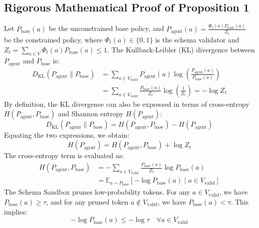\documentclass[10pt,journal,compsoc]{IEEEtran}
\begin{document}
\subsection{Rigorous Mathematical Proof of Proposition 1}
Let $P_{\text{base}}(a)$ be the unconstrained base policy, and $P_{\text{agent}}(a) = \frac{\Phi_t(a) P_{\text{base}}(a)}{Z_t}$ be the constrained policy, where $\Phi_t(a) \in \{0, 1\}$ is the schema validator and $Z_t = \sum_{a \in V} \Phi_t(a) P_{\text{base}}(a) \le 1$.
The Kullback-Leibler (KL) divergence between $P_{\text{agent}}$ and $P_{\text{base}}$ is:
\begin{equation}
\begin{split}
D_{\text{KL}}(P_{\text{agent}} \parallel P_{\text{base}}) &= \sum_{a \in V_{\text{valid}}} P_{\text{agent}}(a) \log \left(\frac{P_{\text{agent}}(a)}{P_{\text{base}}(a)}\right) \\
&= \sum_{a \in V_{\text{valid}}} \frac{P_{\text{base}}(a)}{Z_t} \log \left(\frac{1}{Z_t}\right) = -\log Z_t
\end{split}
\end{equation}
By definition, the KL divergence can also be expressed in terms of cross-entropy $H(P_{\text{agent}}, P_{\text{base}})$ and Shannon entropy $H(P_{\text{agent}})$:
\begin{equation}
D_{\text{KL}}(P_{\text{agent}} \parallel P_{\text{base}}) = H(P_{\text{agent}}, P_{\text{base}}) - H(P_{\text{agent}})
\end{equation}
Equating the two expressions, we obtain:
\begin{equation}
H(P_{\text{agent}}) = H(P_{\text{agent}}, P_{\text{base}}) + \log Z_t
\label{eq:entropy_rel}
\end{equation}
The cross-entropy term is evaluated as:
\begin{equation}
\begin{split}
H(P_{\text{agent}}, P_{\text{base}}) &= -\sum_{a \in V_{\text{valid}}} \frac{P_{\text{base}}(a)}{Z_t} \log P_{\text{base}}(a) \\
&= \mathbb{E}_{a \sim P_{\text{base}}}[-\log P_{\text{base}}(a) \mid a \in V_{\text{valid}}]
\end{split}
\end{equation}
The Schema Sandbox prunes low-probability tokens. For any $a \in V_{\text{valid}}$, we have $P_{\text{base}}(a) \ge \tau$, and for any pruned token $a \notin V_{\text{valid}}$, we have $P_{\text{base}}(a) < \tau$. This implies:
\begin{equation}
-\log P_{\text{base}}(a) \le -\log \tau \quad \forall a \in V_{\text{valid}}
\end{equation}
\end{document}

